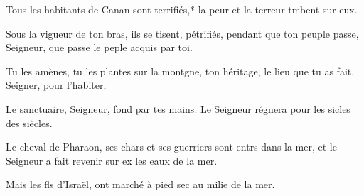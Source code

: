 \item Tous les habitants de Canan sont terrifiés,* la peur et la terreur tmbent sur eux. 
\item Sous la vigueur de ton bras, ils se tisent, pétrifiés,\psstar{} pendant que ton peuple passe, Seigneur, que passe le peple acquis par toi.
\item Tu les amènes, tu les plantes sur la montgne, ton héritage,\psstar{} le lieu que tu as fait, Seigner, pour l’habiter,
\item Le sanctuaire, Seigneur, fond par tes mains.\psstar{} Le Seigneur régnera pour les sicles des siècles.
\item Le cheval de Pharaon, ses chars et ses guerriers sont entrs dans la mer,\psstar{} et le Seigneur a fait revenir sur ex les eaux de la mer.
\item Mais les fls d’Israël,\psstar{} ont marché à pied sec au milie de la mer.